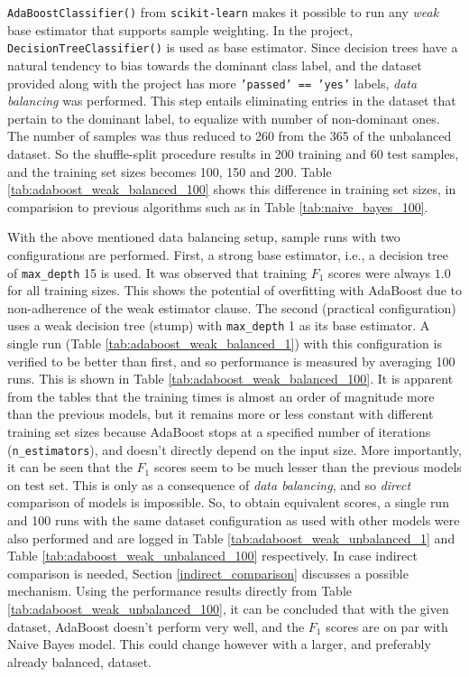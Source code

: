 \documentclass{article}
\begin{document}
	\texttt{AdaBoostClassifier()} from \texttt{scikit-learn} makes it possible to run any \emph{weak} base estimator that supports sample weighting. In the project, \texttt{DecisionTreeClassifier()} is used as base estimator. Since decision trees have a natural tendency to bias towards the dominant class label, and the dataset provided along with the project has more \texttt{'passed' == 'yes'} labels,  \emph{data balancing} was performed. This step entails eliminating entries in the dataset that pertain to the dominant label, to equalize with number of non-dominant ones. The number of samples was thus reduced to 260 from the 365 of the unbalanced dataset. So the shuffle-split procedure results in 200 training and 60 test samples, and the training set sizes becomes 100, 150 and 200. Table \ref{tab:adaboost_weak_balanced_100} shows this difference in training set sizes, in comparision to previous algorithms such as in Table \ref{tab:naive_bayes_100}. 
	
	With the above mentioned data balancing setup, sample runs with two configurations are performed. First, a strong base estimator, i.e., a decision tree of \texttt{max\_depth} 15 is used. It was observed that training $F_1$ scores were always $1.0$ for all training sizes. This shows the potential of overfitting with AdaBoost due to non-adherence of the weak estimator clause. The second (practical configuration) uses a weak decision tree (stump) with \texttt{max\_depth} 1 as its base estimator. A single run (Table \ref{tab:adaboost_weak_balanced_1}) with this configuration is verified to be better than first, and so performance is measured by averaging 100 runs. This is shown in Table \ref{tab:adaboost_weak_balanced_100}. It is apparent from the tables that the training times is almost an order of magnitude more than the previous models, but it remains more or less constant with different training set sizes because AdaBoost stops at a specified number of iterations (\texttt{n\_estimators}), and doesn't directly depend on the input size. More importantly, it can be seen that the $F_1$ scores seem to be much lesser than the previous models on test set. This is only as a consequence of \emph{data balancing}, and so \emph{direct} comparison of models is impossible. So, to obtain equivalent scores, a single run and 100 runs with the same dataset configuration as used with other models were also performed and are logged in Table \ref{tab:adaboost_weak_unbalanced_1} and Table \ref{tab:adaboost_weak_unbalanced_100} respectively. In case indirect comparison is needed, Section \ref{indirect_comparison} discusses a possible mechanism. Using the performance results directly from Table \ref{tab:adaboost_weak_unbalanced_100}, it can be concluded that with the given dataset, AdaBoost doesn't perform very well, and the $F_1$ scores are on par with Naive Bayes model. This could change however with a larger, and preferably already balanced, dataset.
		
\end{document}
